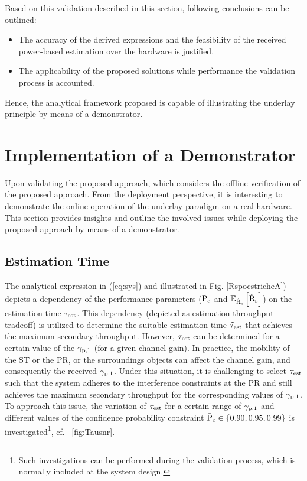 Based on this validation described in this section, following conclusions can be outlined: 
\begin{itemize}
\item The accuracy of the derived expressions and the feasibility of the received power-based estimation over the hardware is justified.
\item The applicability of the proposed solutions while performance the validation process is accounted.    
\end{itemize}
Hence, the analytical framework proposed is capable of illustrating the underlay principle by means of a demonstrator.

\section{Implementation of a Demonstrator}
\label{demo}
Upon validating the proposed approach, which considers the offline verification of the proposed approach. From the deployment perspective, it is interesting to demonstrate the online operation of the underlay paradigm on a real hardware. This section provides insights and outline the involved issues while deploying the proposed approach by means of a demonstrator. 

\subsection{Estimation Time}
\label{esttime}
The analytical expression in (\ref{eq:sys}) and illustrated in Fig. \ref{RspocstricheA}) depicts a dependency of the performance parameters ($\text{P}_{\text{c}}$ and ${\mathbb E}_{\hat{\text{{R}}}_{\text{s}}}\left[ \hat{\text{{R}}}_{\text{s}} \right]$) on the estimation time $\tau_{\text{est}}$. This dependency (depicted as estimation-throughput tradeoff) is utilized to determine the suitable estimation time $\tilde{\tau}_{\text{est}}$ that achieves the maximum secondary throughput. However, $\tilde{\tau}_{\text{est}}$ can be determined for a certain value of the ${\gamma}_{\text{p,1}}$ (for a given channel gain). In practice, the mobility of the ST or the PR, or the surroundings objects can affect the channel gain, and consequently the received ${\gamma}_{\text{p,1}}$. Under this situation, it is challenging to select $\tilde{\tau}_{\text{est}}$ such that the system adheres to the interference constraints at the PR and still achieves the maximum secondary throughput for the corresponding values of ${\gamma}_{\text{p,1}}$. To approach this issue, the variation of $\tilde{\tau}_{\text{est}}$ for a certain range of ${\gamma}_{\text{p,1}}$ and different values of the confidence probability constraint $\bar{\text{P}}_{\text{c}} \in \{0.90, 0.95, 0.99\}$ is investigated\footnote{Such investigations can be performed during the validation process, which is normally included at the system design.}, cf. \figurename~\ref{fig:Tausnr}. %

